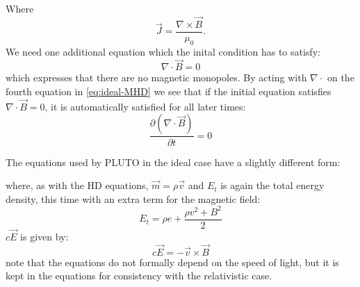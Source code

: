 Where $$\vec{J} = \frac{\nabla\times \vec{B}}{\mu_0}. $$ We need one additional equation which the inital condition has to satisfy:
\begin{equation*}
	\nabla\cdot\vec{B}=0
\end{equation*}
which expresses that there are no magnetic monopoles. By acting with $\nabla\cdot$ on the fourth equation in \autoref{eq:ideal-MHD} we see that if the initial equation satisfies $\nabla\cdot\vec{B}=0$, it is automatically satisfied for all later times:
\begin{equation*}
	\frac{\partial (\nabla\cdot\vec{B})}{\partial t} = 0
\end{equation*}

The equations used by PLUTO in the ideal case have a slightly different form: 

{\centering 
\noindent {}
\par}

where, as with the HD equations, $\vec{m}=\rho\vec{v}$ and $E_t$ is again the total energy density, this time with an extra term for the magnetic field:
\begin{equation*}
	E_t = \rho e + \frac{\rho v^2 + B^2}{2}
\end{equation*}
$c\vec{E}$ is given by:
\begin{equation*}
	c\vec{E} = -\vec{v}\times \vec{B}
\end{equation*}
note that the equations do not formally depend on the speed of light, but it is kept in the equations for consistency with the relativistic case.





